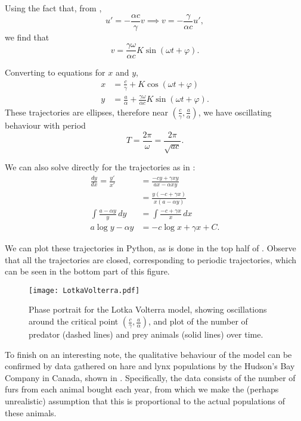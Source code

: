 Using the fact that, from ,
\[
u' = -\frac{\alpha c}{\gamma}v \implies v = -\frac{\gamma}{\alpha c}u',
\]
we find that
\[
v = \frac{\gamma \omega}{\alpha c}K\sin(\omega t + \varphi).
\]

Converting to equations for $x$ and $y$,
\begin{align*}
	x &= \frac{c}{\gamma} + K\cos(\omega t + \varphi) \\
	y &= \frac{a}{\alpha} + \frac{\gamma \omega}{\alpha c}K\sin(\omega t + \varphi).
\end{align*}
These trajectories are ellipses, therefore near $(\frac{c}{\gamma}, \frac{a}{\alpha})$, we have oscillating behaviour with period
\[
T = \frac{2\pi}{\omega} = \frac{2\pi}{\sqrt{ac}}.
\]

We can also solve directly for the trajectories as in :
\begin{align*}
	\frac{dy}{dx} = \frac{y'}{x'} &= \frac{-cy + \gamma xy}{ax - \alpha xy} \\
	&= \frac{y(-c+\gamma x)}{x(a-\alpha y)} \\
	\int \frac{a-\alpha y}{y} \,dy &= \int \frac{-c+\gamma x}{x}\,dx \\
	a\log y - \alpha y &= -c\log x + \gamma x + C.
\end{align*}

We can plot these trajectories in Python, as is done in the top half of . Observe that all the trajectories are closed, corresponding to periodic trajectories, which can be seen in the bottom part of this figure.

\begin{figure}[!ht]
	\centering
	\texttt{[image: LotkaVolterra.pdf]}
	\caption{Phase portrait for the Lotka Volterra model, showing oscillations around the critical point $(\frac{c}{\gamma}, \frac{a}{\alpha})$, and plot of the number of predator (dashed lines) and prey animals (solid lines) over time.}
	\label{fig:lotkavolterra}
\end{figure}

To finish on an interesting note, the qualitative behaviour of the model can be confirmed by data gathered on hare and lynx populations by the Hudson's Bay Company in Canada, shown in . Specifically, the data consists of the number of furs from each animal bought each year, from which we make the (perhaps unrealistic) assumption that this is proportional to the actual populations of these animals.

